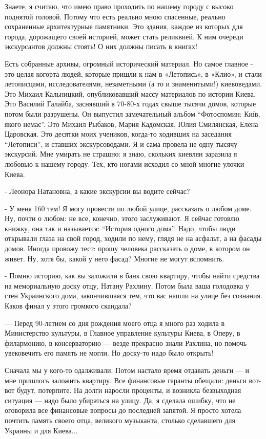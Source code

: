 Знаете, я считаю, что имею право проходить по нашему городу с высоко поднятой
головой. Потому что есть реально мною спасенные, реально сохраненные
архитектурные памятники. Это здания, каждое из которых для города, дорожащего
своей историей, может стать реликвией. К ним очереди экскурсантов должны
стоять! О них должны писать в книгах! 

Есть собранные архивы, огромный исторический материал. Но самое главное - это
целая когорта людей, которые пришли к нам в «Летопись», в «Клио», и стали
летописцами, исследователями, незаметными (а то и знаменитыми!) киевоведами.
Это Михаил Кальницкий, опубликовавший массу материалов по истории Киева. Это
Василий Галайба, заснявший в 70-80-х годах свыше тысячи домов, которые потом
были разрушены. Он выпустил замечательный альбом “Фотоспомин: Київ, якого
немає”. Это Михаил Рыбаков, Мария Кадомская, Юлия Смилянская, Елена Царовская.
Это десятки моих учеников, когда-то ходивших на заседания “Летописи”, и ставших
экскурсоводами. Я и сама провела не одну тысячу экскурсий. Мне умирать не
страшно: я знаю, скольких киевлян заразила я любовью к нашему городу. Тех, кто
ногами исходил со мной многие улочки Киева. 

- Леонора Натановна, а какие экскурсии вы водите сейчас?

- У меня 160 тем! Я могу провести по любой улице, рассказать о любом доме. Ну,
почти о любом: не все, конечно, этого заслуживают. Я сейчас готовлю книжку, она
так и называется: “История одного дома”. Надо, чтобы люди открывали глаза на
свой город, ходили по нему, глядя не на асфальт, а на фасады домов. Иногда
провожу тест: прошу человека рассказать о доме, в котором он живет. Ну, хотя
бы, какой у него фасад? Многие не могут вспомнить. 

- Помню историю, как вы заложили в банк свою квартиру, чтобы найти средства на
мемориальную доску отцу, Натану Рахлину. Потом была ваша голодовка у стен
Украинского дома, закончившаяся тем, что вас нашли на улице без сознания. Каков
финал у этого громкого скандала? 

— Перед 90-летием со дня рождения моего отца я много раз ходила в Министерство
культуры, в Главное управление культуры Киева, в Оперу, в филармонию, в
консерваторию — везде прекрасно знали Рахлина, но помочь увековечить его память
не могли. Но доску-то надо было открыть! 

Сначала мы у кого-то одалживали. Потом настало время отдавать деньги — и мне
пришлось заложить квартиру. Все финансовые гаранты обещали: деньги вот-вот
будут, потерпите. На долги наросли проценты, и возникла безвыходная ситуация —
надо было убираться на улицу. Да, я сделала ошибку, что не оговорила все
финансовые вопросы до последней запятой. Я просто хотела почтить память своего
отца, великого музыканта, столько сделавшего для Украины и для Киева... 

